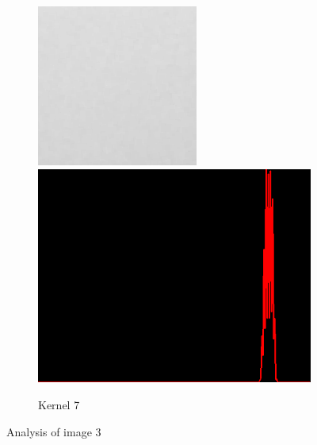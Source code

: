 \begin{figure}[H]
\begin{subfigure}[b]{0.24\textwidth}
\begin{center}
        	\text{ }
        \end{center}
        \includegraphics[width=\textwidth]{img3/rect_7_midpoint_7_final_img3.png}\\[0.1cm]
        \includegraphics[width=\textwidth]{img3/hist_rect_7_midpoint_7_final_img3.png}
        \caption{Kernel 7}
        \label{fig:img3_kernel_7}
    \end{subfigure}
    \caption{Analysis of image 3}
    \label{fig:img3_kernel}
\end{figure}

